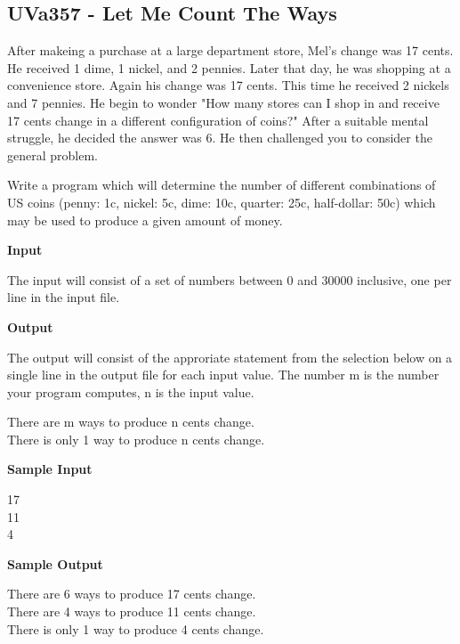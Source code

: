 \subsection{UVa357 - Let Me Count The Ways}
After makeing a purchase at a large department store, Mel's change was 17 cents. He received 1 dime, 1 nickel, and 2 pennies. Later that day, he was shopping at a convenience store. Again his change was 17 cents. This time he received 2 nickels and 7 pennies. He begin to wonder "How many stores can I shop in and receive 17 cents change in a different configuration of coins?" After a suitable mental struggle, he decided the answer was 6. He then challenged you to consider the general problem.

Write a program which will determine the number of different combinations of US coins (penny: 1c, nickel: 5c, dime: 10c, quarter: 25c, half-dollar: 50c) which may be used to produce a given amount of money.

\begin{flushleft}
{\color{red} \textbf{Input}}
\end{flushleft}
The input will consist of a set of numbers between 0 and 30000 inclusive, one per line in the input file.

\begin{flushleft}
{\color{red} \textbf{Output}}
\end{flushleft}
The output will consist of the approriate statement from the selection below on a single line in the output file for each input value. The number m is the number your program computes, n is the input value.

\begin{flushleft}
There are m ways to produce n cents change.\\
There is only 1 way to produce n cents change.\\
\end{flushleft}

\begin{flushleft}
{\color{red} \textbf{Sample Input}}
\end{flushleft}
\begin{flushleft}
17\\
11\\
4\\
\end{flushleft}

\begin{flushleft}
{\color{red} \textbf{Sample Output}}
\end{flushleft}
\begin{flushleft}
There are 6 ways to produce 17 cents change.\\
There are 4 ways to produce 11 cents change.\\
There is only 1 way to produce 4 cents change.\\
\end{flushleft}

\newpage